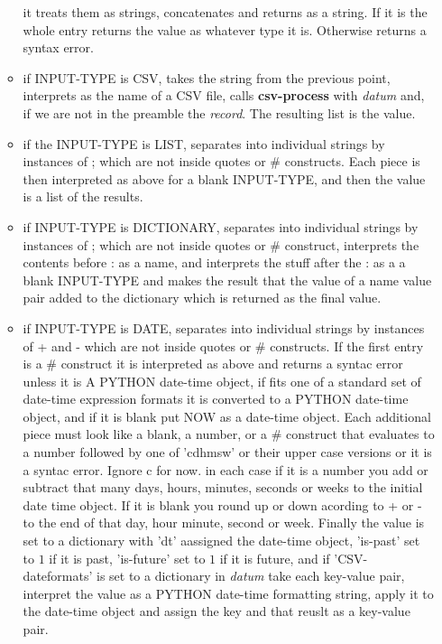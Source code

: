 \documentclass{article}
\begin{document}
\begin{enumerate}
\begin{itemize}
      it treats them as strings, concatenates and returns as a
      string.  If it is the whole entry returns the value as whatever
      type it is.  Otherwise returns a syntax error.
    \item if INPUT-TYPE is CSV, takes the string from the previous
      point, interprets as the name of a CSV file, calls
      \textbf{csv-process} with \emph{datum} and, if we are not in the
      preamble the \emph{record}.  The resulting list is the value.
    \item if the INPUT-TYPE is LIST, separates into individual strings
      by instances of ; which are not inside quotes or \# constructs.
      Each piece is then interpreted as above for a blank INPUT-TYPE,
      and then the value is a list of the results.
    \item if INPUT-TYPE is DICTIONARY, separates into individual
      strings by instances of ; which are not inside quotes or \#
      construct, interprets the contents before : as a name, and
      interprets the stuff after the : as a a blank INPUT-TYPE and
      makes the result that the value of a name value pair added to
      the dictionary which is returned as the final value.
\item if INPUT-TYPE is DATE, separates into individual strings by
  instances of + and - which are not inside quotes or \# constructs.
  If the first entry is a \# construct it is interpreted as above and
  returns a syntac error unless it is A PYTHON date-time object, if fits one of a standard set of date-time
  expression formats it is converted to a PYTHON date-time object, and
  if it is blank put NOW as a date-time object.  Each additional piece
  must look like a blank, a number, or a \# construct that evaluates
  to a number followed by one of 'cdhmsw' or their upper case versions
  or it is a syntac error.  Ignore c for now.  in each case if it is a
  number you add or subtract that many days, hours, minutes, seconds
  or weeks to the initial date time object.  If it is blank you round
  up or down acording to + or - to the end of that day, hour minute,
  second or week. Finally the value is set to a dictionary with 'dt'
  aassigned the date-time object, 'is-past' set to $1$ if it is past,
  'is-future' set to  $1$ if it is future, and if 
  'CSV-dateformats' is set to a dictionary in \emph{datum} take each
  key-value pair, interpret the value as a PYTHON date-time formatting
  string, apply it to the date-time object and assign the key and that
  reuslt as a key-value pair.
  \end{itemize}

\end{enumerate}
\end{document}
